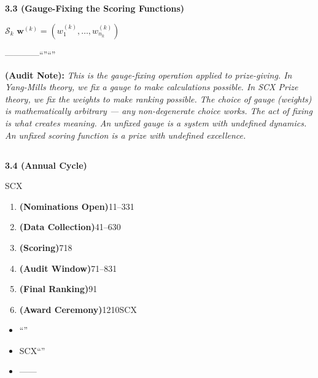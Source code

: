 \documentclass[12pt,a4paper]{article}
\theoremstyle{remark}
\newcommand{\scoreOp}{\mathcal{S}}
\newenvironment{honestbox}{%
    \medskip\noindent
    \color{red}
    \begin{minipage}{0.92\textwidth}
    \textbf{}
    \begin{itemize}[leftmargin=*]
}{%
    \end{itemize}
    \end{minipage}
    \medskip
}
\newcommand{\auditnote}[1]{%
    \medskip\noindent
    \textbf{ (Audit Note):} \textit{#1}%
}
\begin{document}
\subsection{}

\noindent
\textbf{3.3  (Gauge-Fixing the Scoring Functions)}

 $\scoreOp_k$  $\mathbf{w}^{(k)} = (w_1^{(k)}, \dots, w_{n_k}^{(k)})$ 

————\textbf{}``''\textit{}``''

\auditnote{This is the gauge-fixing operation applied to prize-giving. In Yang-Mills theory, we fix a gauge to make calculations possible. In SCX Prize theory, we fix the weights to make ranking possible. The choice of gauge (weights) is mathematically arbitrary — any non-degenerate choice works. The act of \textit{fixing} is what creates meaning. An unfixed gauge is a system with undefined dynamics. An unfixed scoring function is a prize with undefined excellence.}

\subsection{}

\noindent
\textbf{3.4  (Annual Cycle)}

SCX

\begin{enumerate}[label=\textbf{ \arabic*}.]
    \item \textbf{ (Nominations Open)}11--331
    \item \textbf{ (Data Collection)}41--630
    \item \textbf{ (Scoring)}718
    \item \textbf{ (Audit Window)}71--831
    \item \textbf{ (Final Ranking)}91
    \item \textbf{ (Award Ceremony)}1210SCX
\end{enumerate}

\begin{honestbox}
    \item ``''
    \item SCX\textbf{}\textbf{}``''
    \item ——
\end{honestbox}

\newpage

\section{}
\label{sec:shakes_nobel}
\end{document}
